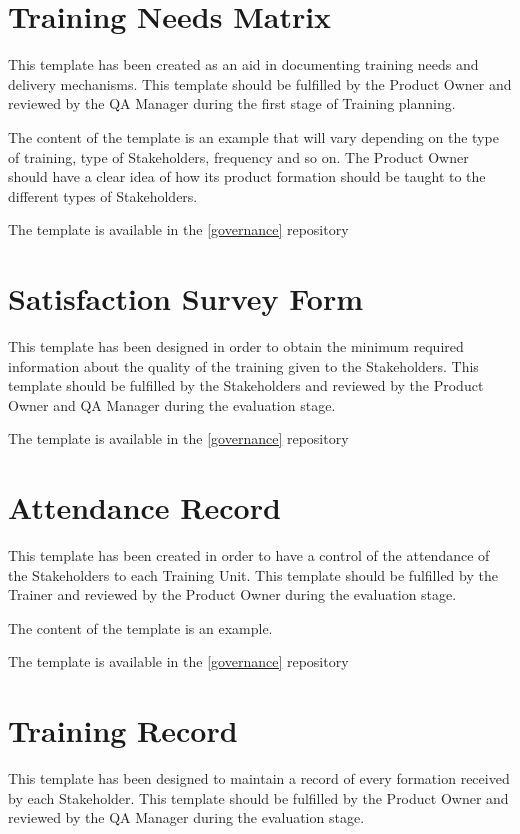 \documentclass{template/openetcs_article}
\begin{document}
\newpage
\begin{appendices}
   \addappheadtotoc
   \appendixpage
\section{Training Needs Matrix} 
\label{App:Training-Needs-Matrix}
This template has been created as an aid in documenting training needs and delivery mechanisms. This template should be fulfilled by the Product Owner and reviewed by the QA Manager during the first stage of Training planning. 

The content of the template is an example that will vary depending on the type of training, type of Stakeholders, frequency and so on. The Product Owner should have a clear idea of how its product formation should be taught to the different types of Stakeholders.

The template is available in the \href{https://github.com/openETCS/governance/tree/master/Templates}{[governance]} repository

\section{Satisfaction Survey Form} 
\label{App:Satisfaction-Survey-form}
This template has been designed in order to obtain the minimum required information about the quality of the training given to the Stakeholders. This template should be fulfilled by the Stakeholders and reviewed by the Product Owner and QA Manager during the evaluation stage. 

The template is available in the \href{https://github.com/openETCS/governance/tree/master/Templates}{[governance]} repository

\section{Attendance Record} 
\label{App:Attendance-Record}
This template has been created in order to have a control of the attendance of the Stakeholders to each Training Unit. This template should be fulfilled by the Trainer and  reviewed by the Product Owner during the evaluation stage. 

The content of the template is an example. 

The template is available in the \href{https://github.com/openETCS/governance/tree/master/Templates}{[governance]} repository


\section{Training Record} 
\label{App:Training-Record}
This template has been designed to maintain a record of every formation received by each Stakeholder. This template should be fulfilled by the Product Owner and reviewed by the QA Manager during the evaluation stage. 


\end{appendices}
\end{document}

